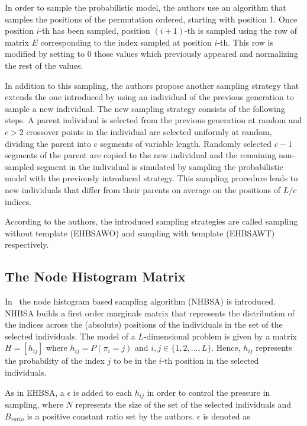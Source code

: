In order to sample the probabilistic model, the authors use an algorithm that samples the positions of the permutation ordered, starting with position 1. Once position $i$-th has been sampled, position $(i+1)$-th is sampled using the row of matrix $E$ corresponding to the index sampled at position $i$-th. This row is modified by setting to $0$ those values which previously appeared and normalizing the rest of the values. %

In addition to this sampling, the authors propose another sampling strategy that extends the one introduced by using an individual of the previous generation to sample a new individual. The new sampling strategy consists of the following steps. A parent individual is selected from the previous generation at random and $c>2$ crossover points in the individual are selected uniformly at random, dividing the parent into $c$ segments of variable length. Randomly selected $c-1$ segments of the parent are copied to the new individual and the remaining non-sampled segment in the individual is simulated by sampling the probabilistic model with the previously introduced strategy. This sampling procedure leads to new individuals that differ from their parents on average on the positions of $L/c$ indices.

According to the authors, the introduced sampling strategies are called sampling without template (EHBSAWO) and sampling with template (EHBSAWT) respectively. 



\subsection{The Node Histogram Matrix}
In~\citep{tsutsui2006node} the node histogram based sampling algorithm (NHBSA) is introduced. NHBSA builds a first order marginals matrix that represents the distribution of the indices across the (absolute) positions of the individuals in the set of the selected individuals. The model of a $L$-dimensional problem is given by a matrix $H=[h_{ij}]$ where $h_{ij} =P(\pi_i =j)$ and $i, j \in \{1,2,...,L\}$. Hence, $h_{ij}$ represents the probability of the index $j$ to be in the $i$-th position in the selected individuals.

As in EHBSA, a $\epsilon$ is added to each $h_{ij}$ in order to control the pressure in sampling, where $N$ represents the size of the set of the selected individuals and
$B_{ratio}$ is a positive constant ratio set by the authors. $\epsilon$ is denoted as



